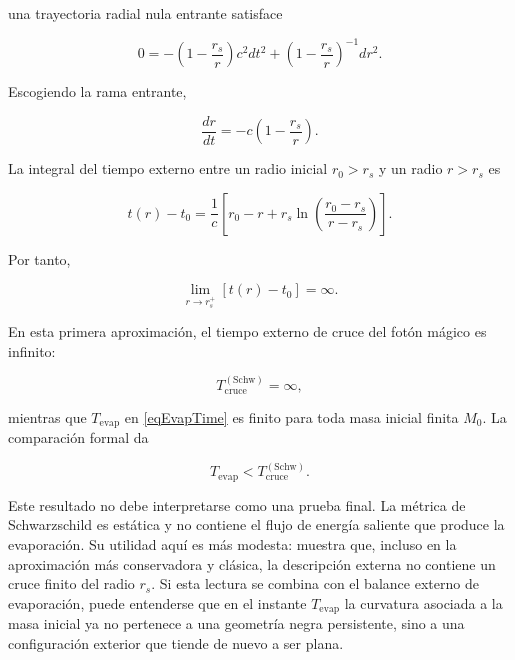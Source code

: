 \documentclass[
aps,
prd,
reprint,
superscriptaddress,
nofootinbib,
amsmath,
amssymb
]{revtex4-2}
\begin{document}
una trayectoria radial nula entrante satisface

\begin{equation}
0=
-
\left(
1-\frac{r_s}{r}
\right)c^2dt^2
+
\left(
1-\frac{r_s}{r}
\right)^{-1}dr^2.
\end{equation}

Escogiendo la rama entrante,

\begin{equation}
\frac{dr}{dt}
=
-
c
\left(
1-\frac{r_s}{r}
\right).
\label{eqSchwarzschildNull}
\end{equation}

La integral del tiempo externo entre un radio inicial $r_0>r_s$ y un radio $r>r_s$ es

\begin{equation}
t(r)-t_0
=
\frac{1}{c}
\left[
r_0-r
+
r_s
\ln
\left(
\frac{r_0-r_s}{r-r_s}
\right)
\right].
\label{eqSchwarzschildCoordinateTime}
\end{equation}

Por tanto,

\begin{equation}
\lim_{r\rightarrow r_s^+}
\left[
t(r)-t_0
\right]
=
\infty.
\end{equation}

En esta primera aproximación, el tiempo externo de cruce del fotón mágico es infinito:

\begin{equation}
T_{\mathrm{cruce}}^{(\mathrm{Schw})}
=
\infty,
\end{equation}

mientras que $T_{\mathrm{evap}}$ en \eqref{eqEvapTime} es finito para toda masa inicial finita $M_0$. La comparación formal da

\begin{equation}
T_{\mathrm{evap}}
<
T_{\mathrm{cruce}}^{(\mathrm{Schw})}.
\end{equation}

Este resultado no debe interpretarse como una prueba final. La métrica de Schwarzschild es estática y no contiene el flujo de energía saliente que produce la evaporación. Su utilidad aquí es más modesta: muestra que, incluso en la aproximación más conservadora y clásica, la descripción externa no contiene un cruce finito del radio $r_s$. Si esta lectura se combina con el balance externo de evaporación, puede entenderse que en el instante $T_{\mathrm{evap}}$ la curvatura asociada a la masa inicial ya no pertenece a una geometría negra persistente, sino a una configuración exterior que tiende de nuevo a ser plana.
\end{document}
